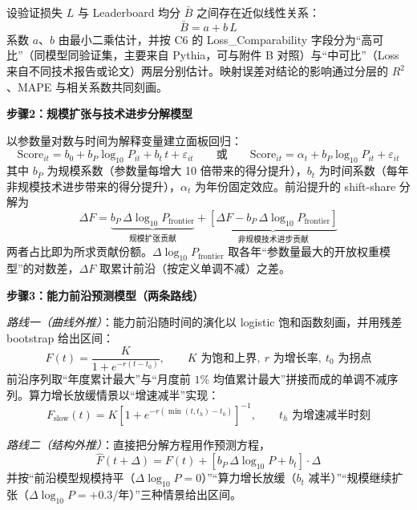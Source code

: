 设验证损失 $L$ 与 Leaderboard 均分 $\bar B$ 之间存在近似线性关系：
\begin{equation}
    \bar B = a + b\,L
\end{equation}
系数 $a$、$b$ 由最小二乘估计，并按 C6 的 Loss\_Comparability 字段分为“高可比”（同模型同验证集，主要来自 Pythia，可与附件 B 对照）与“中可比”（Loss 来自不同技术报告或论文）两层分别估计。映射误差对结论的影响通过分层的 $R^2$、MAPE 与相关系数共同刻画。

\textbf{步骤2：规模扩张与技术进步分解模型}

以参数量对数与时间为解释变量建立面板回归：
\begin{equation}
    \text{Score}_{it} = b_0 + b_P\log_{10}P_{it} + b_t\,t + \varepsilon_{it}
    \qquad\text{或}\qquad
    \text{Score}_{it} = \alpha_t + b_P\log_{10}P_{it} + \varepsilon_{it}
\end{equation}
其中 $b_P$ 为规模系数（参数量每增大 10 倍带来的得分提升），$b_t$ 为时间系数（每年非规模技术进步带来的得分提升），$\alpha_t$ 为年份固定效应。前沿提升的 shift-share 分解为
\begin{equation}
    \Delta F = \underbrace{b_P\,\Delta\log_{10}P_{\text{frontier}}}_{\text{规模扩张贡献}}
    + \underbrace{\left[\Delta F - b_P\,\Delta\log_{10}P_{\text{frontier}}\right]}_{\text{非规模技术进步贡献}}
\end{equation}
两者占比即为所求贡献份额。$\Delta\log_{10}P_{\text{frontier}}$ 取各年“参数量最大的开放权重模型”的对数差，$\Delta F$ 取累计前沿（按定义单调不减）之差。

\textbf{步骤3：能力前沿预测模型（两条路线）}

\emph{路线一（曲线外推）}：能力前沿随时间的演化以 logistic 饱和函数刻画，并用残差 bootstrap 给出区间：
\begin{equation}
    F(t) = \frac{K}{1+e^{-r(t-t_0)}},\qquad K \text{ 为饱和上界},\ r \text{ 为增长率},\ t_0 \text{ 为拐点}
\end{equation}
前沿序列取“年度累计最大”与“月度前 $1\%$ 均值累计最大”拼接而成的单调不减序列。算力增长放缓情景以“增速减半”实现：
\begin{equation}
    F_{\text{slow}}(t)=K\left[1+e^{-r(\min(t,t_h)-t_0)}\right]^{-1},\qquad t_h \text{ 为增速减半时刻}
\end{equation}

\emph{路线二（结构外推）}：直接把分解方程用作预测方程，
\begin{equation}
    \hat F(t+\Delta) = F(t) + \left[b_P\,\Delta\log_{10}P + b_t\right]\cdot\Delta
\end{equation}
并按“前沿模型规模持平（$\Delta\log_{10}P=0$）”“算力增长放缓（$b_t$ 减半）”“规模继续扩张（$\Delta\log_{10}P=+0.3$/年）”三种情景给出区间。

